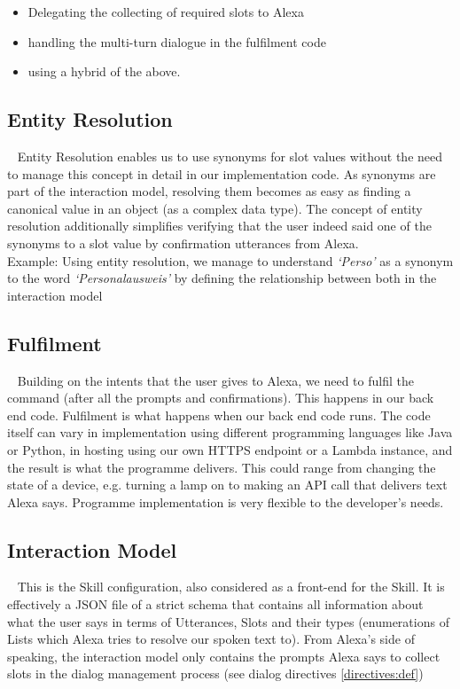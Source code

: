 	\begin{itemize}
		\item Delegating the collecting of required slots to Alexa
		\item handling the multi-turn dialogue in the fulfilment code
		\item using a hybrid of the above.

	\end{itemize}
	
	
	
	\subsection*{Entity Resolution}~\label{entityRes:def}	
	Entity Resolution enables us to use synonyms for slot values without the need to manage this concept in detail in our implementation code. As synonyms are part of the interaction model, resolving them becomes as easy as finding a canonical value in an object (as a complex data type). The concept of entity resolution additionally simplifies verifying that the user indeed said one of the synonyms to a slot value by confirmation utterances from Alexa.\\
	Example: Using entity resolution, we manage to understand \textit{`Perso'} as a synonym to the word \textit{`Personalausweis'} by defining the relationship between both in the interaction model
	
	
	\subsection*{Fulfilment}~\label{fulfillment:def}	
	Building on the intents that the user gives to Alexa, we need to fulfil the command (after all the prompts and confirmations). This happens in our back end code. Fulfilment is what happens when our back end code runs. The code itself can vary in implementation using different programming languages like Java or Python, in hosting using our own HTTPS endpoint or a Lambda instance, and the result is what the programme delivers. This could range from changing the state of a device, e.g. turning a lamp on to making an API call that delivers text Alexa says. Programme implementation is very flexible to the developer's needs.
	
	\subsection*{Interaction Model}~\label{interactionMdl:def}
	This is the Skill configuration, also considered as a front-end for the Skill. It is effectively a JSON file of a strict schema that contains all information about what the user says in terms of Utterances, Slots and their types (enumerations of Lists which Alexa tries to resolve our spoken text to). From Alexa's side of speaking, the interaction model only contains the prompts Alexa says to collect slots in the dialog management process (see dialog directives \ref{directives:def})
	
